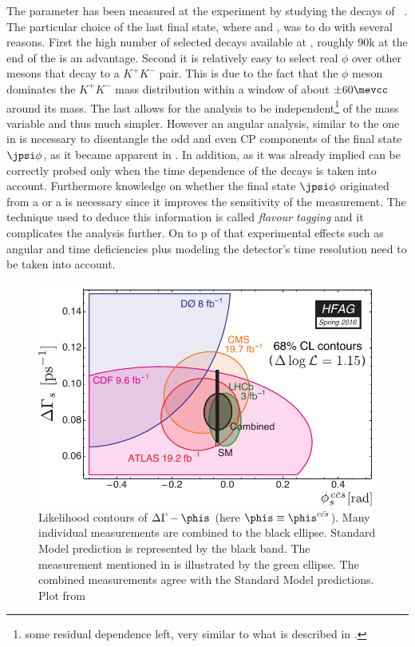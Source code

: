 The parameter \phis has been measured at the \lhcb experiment by studying the decays of \BsJpsiPhi~\cite{phis-3fb-paper}.
The particular choice of the last final state, where \phiKK and \Jpsimumu, was to do with several reasons. First the high number
of selected \BsJpsiPhi decays available at \lhcb, roughly $90$k at the end of the \runtwo is an advantage. Second it is relatively easy
to select real $\phi$ over other mesons that decay to a $K^+K^-$ pair. This is due to the fact that the $\phi$ meson dominates the
$K^+K^-$ mass distribution within a window of about $\pm 60 \mevcc$ around its mass. The last allows for the analysis to be
independent\footnote{some residual dependence left, very similar to what is described in . }
of the \mkk mass variable and thus much simpler. However an angular analysis, similar to the one in  is necessary
to disentangle the odd and even CP components of the final state $\jpsi\phi$, as it became apparent in .
In addition, as it was already implied \phis can be correctly probed only when the time dependence of the \BsJpsiPhi decays is taken into
account. Furthermore knowledge on whether the final state $\jpsi\phi$ originated from a \Bs or a \Bsb is necessary since it
improves the sensitivity of the \phis measurement. The technique used to deduce this information is called {\it flavour tagging}
and it complicates the analysis further. On to p of that experimental effects such as angular and time deficiencies plus modeling the
\lhcb detector's time resolution need to be taken into account.

\begin{figure}[h]
  \begin{center}
    \includegraphics[trim=0cm 0cm 0cm 0cm, clip=true, scale=0.8]{Figures/Chapter1/hfag_Spring2016_DGsphis_zoom.pdf}
    \caption{Likelihood contours of $\Delta\Gamma-\phis$ (here $\phis\equiv \phis^{c\bar{cs}}$). Many individual measurements are
             combined to the black ellipse. Standard Model prediction is represented by the black band. The \lhcb measurement
             mentioned in  is illustrated by the green ellipse. The combined measurements agree with the Standard Model
             predictions. Plot from \cite{hfag-2014} }
    \label{hfag_phis_dg}
  \end{center}
\end{figure}

